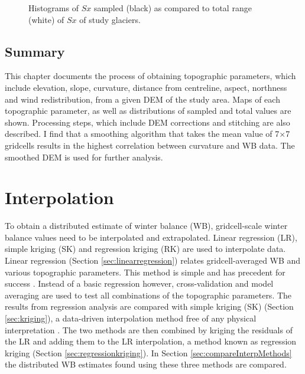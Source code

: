 \documentclass{sfuthesis}
\begin{document}
\begin{figure}[H]
	\caption{Histograms of $Sx$ sampled (black) as compared to total range (white) of $Sx$ of study glaciers.}
	\label{sampledRange:Sx}
\end{figure}


\section{Summary}

This chapter documents the process of obtaining topographic parameters, which include elevation, slope, curvature, distance from centreline, aspect, northness and wind redistribution, from a given DEM of the study area. Maps of each topographic parameter, as well as distributions of sampled and total values are shown. Processing steps, which include DEM corrections and stitching are also described. I find that a smoothing algorithm that takes the mean value of 7$\times$7 gridcells results in the highest correlation between curvature and WB data. The smoothed DEM is used for further analysis. 



\chapter{Interpolation}

To obtain a distributed estimate of winter balance (WB), gridcell-scale winter balance values need to be interpolated and extrapolated. Linear regression (LR), simple kriging (SK) and regression kriging (RK) are used to interpolate data. Linear regression (Section \ref{sec:linearregression}) relates gridcell-averaged WB and various topographic parameters. This method is simple and has precedent for success \citep[e.g.][]{McGrath2015}. Instead of a basic regression however, cross-validation and model averaging are used to test all combinations of the topographic parameters. The results from regression analysis are compared with simple kriging (SK) (Section \ref{sec:kriging}), a data-driven interpolation method free of any physical interpretation \citep[e.g.][]{Hock1999}. The two methods are then combined by kriging the residuals of the LR and adding them to the LR interpolation, a method known as regression kriging (Section \ref{sec:regressionkriging}). In Section \ref{sec:compareInterpMethods} the distributed WB estimates found using these three methods are compared.
\end{document}
